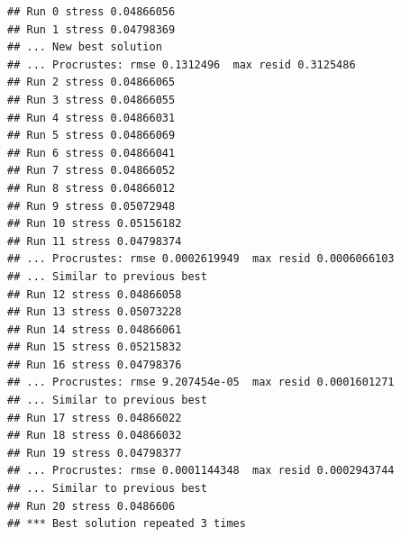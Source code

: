 \documentclass[
]{article}
\newenvironment{Shaded}{\begin{snugshade}}{\end{snugshade}}
\newcommand{\AttributeTok}[1]{\textcolor[rgb]{0.13,0.29,0.53}{#1}}
\newcommand{\CommentTok}[1]{\textcolor[rgb]{0.56,0.35,0.01}{\textit{#1}}}
\newcommand{\DecValTok}[1]{\textcolor[rgb]{0.00,0.00,0.81}{#1}}
\newcommand{\DocumentationTok}[1]{\textcolor[rgb]{0.56,0.35,0.01}{\textbf{\textit{#1}}}}
\newcommand{\FunctionTok}[1]{\textcolor[rgb]{0.13,0.29,0.53}{\textbf{#1}}}
\newcommand{\NormalTok}[1]{#1}
\newcommand{\OtherTok}[1]{\textcolor[rgb]{0.56,0.35,0.01}{#1}}
\newcommand{\SpecialCharTok}[1]{\textcolor[rgb]{0.81,0.36,0.00}{\textbf{#1}}}
\newcommand{\StringTok}[1]{\textcolor[rgb]{0.31,0.60,0.02}{#1}}
\begin{document}
\begin{Shaded}
\end{Shaded}

\begin{verbatim}
## Run 0 stress 0.04866056 
## Run 1 stress 0.04798369 
## ... New best solution
## ... Procrustes: rmse 0.1312496  max resid 0.3125486 
## Run 2 stress 0.04866065 
## Run 3 stress 0.04866055 
## Run 4 stress 0.04866031 
## Run 5 stress 0.04866069 
## Run 6 stress 0.04866041 
## Run 7 stress 0.04866052 
## Run 8 stress 0.04866012 
## Run 9 stress 0.05072948 
## Run 10 stress 0.05156182 
## Run 11 stress 0.04798374 
## ... Procrustes: rmse 0.0002619949  max resid 0.0006066103 
## ... Similar to previous best
## Run 12 stress 0.04866058 
## Run 13 stress 0.05073228 
## Run 14 stress 0.04866061 
## Run 15 stress 0.05215832 
## Run 16 stress 0.04798376 
## ... Procrustes: rmse 9.207454e-05  max resid 0.0001601271 
## ... Similar to previous best
## Run 17 stress 0.04866022 
## Run 18 stress 0.04866032 
## Run 19 stress 0.04798377 
## ... Procrustes: rmse 0.0001144348  max resid 0.0002943744 
## ... Similar to previous best
## Run 20 stress 0.0486606 
## *** Best solution repeated 3 times
\end{verbatim}
\end{document}
